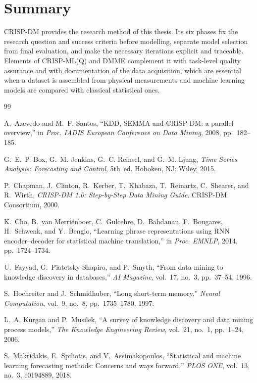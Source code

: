 \documentclass[11pt,a4paper]{article}
\begin{document}
\section{Summary}

CRISP-DM provides the research method of this thesis. Its six phases fix the
research question and success criteria before modelling, separate model
selection from final evaluation, and make the necessary iterations explicit and
traceable. Elements of CRISP-ML(Q) and DMME complement it with task-level
quality assurance and with documentation of the data acquisition, which are
essential when a dataset is assembled from physical measurements and machine
learning models are compared with classical statistical ones.

\begin{thebibliography}{99}
\small

A.~Azevedo and M.~F. Santos,
``KDD, SEMMA and CRISP-DM: a parallel overview,''
in \emph{Proc. IADIS European Conference on Data Mining}, 2008, pp.~182--185.

G.~E.~P. Box, G.~M. Jenkins, G.~C. Reinsel, and G.~M. Ljung,
\emph{Time Series Analysis: Forecasting and Control}, 5th~ed.
Hoboken, NJ: Wiley, 2015.

P.~Chapman, J.~Clinton, R.~Kerber, T.~Khabaza, T.~Reinartz, C.~Shearer, and
R.~Wirth,
\emph{CRISP-DM 1.0: Step-by-Step Data Mining Guide}.
CRISP-DM Consortium, 2000.

K.~Cho, B.~van Merri\"enboer, C.~Gulcehre, D.~Bahdanau, F.~Bougares,
H.~Schwenk, and Y.~Bengio,
``Learning phrase representations using RNN encoder--decoder for statistical
machine translation,''
in \emph{Proc. EMNLP}, 2014, pp.~1724--1734.

U.~Fayyad, G.~Piatetsky-Shapiro, and P.~Smyth,
``From data mining to knowledge discovery in databases,''
\emph{AI Magazine}, vol.~17, no.~3, pp.~37--54, 1996.

S.~Hochreiter and J.~Schmidhuber,
``Long short-term memory,''
\emph{Neural Computation}, vol.~9, no.~8, pp.~1735--1780, 1997.

L.~A. Kurgan and P.~Musilek,
``A survey of knowledge discovery and data mining process models,''
\emph{The Knowledge Engineering Review}, vol.~21, no.~1, pp.~1--24, 2006.

S.~Makridakis, E.~Spiliotis, and V.~Assimakopoulos,
``Statistical and machine learning forecasting methods: Concerns and ways
forward,''
\emph{PLOS ONE}, vol.~13, no.~3, e0194889, 2018.


\end{thebibliography}
\end{document}
